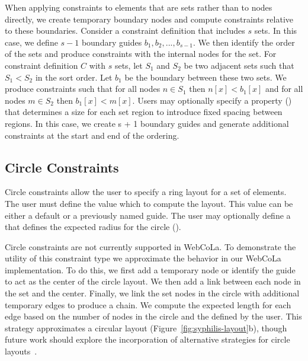 When applying constraints to elements that are sets rather than to nodes
directly, we create temporary boundary nodes and compute constraints relative to
these boundaries. Consider a constraint definition that includes $s$ sets. 
In this case, we define $s-1$ boundary guides $b_1, b_2, ..., b_{s-1}$. We then
identify the order of the sets and produce constraints with the internal
nodes for the set. For constraint definition $C$ with $s$ sets, let $S_1$ and
$S_2$ be two adjacent sets such that $S_1 < S_2$ in the sort order. Let $b_1$ be
the boundary between these two sets. We produce constraints such that for all
nodes $n \in S_1$ then $n[x] < b_1[x]$ and for all nodes $m \in S_2$ then $b_1[x] < m[x]$.
Users may optionally specify a  property ()
that determines a size for each set region to introduce fixed spacing between regions.
In this case, we create s + 1 boundary guides and generate additional 
constraints at the start and end of the ordering.

\subsection{Circle Constraints}
Circle constraints allow the user to specify a ring layout for a set of
elements. The user must define the value  which to compute 
the layout. This value can be either a default  or a previously 
named guide. The user may optionally define a  that 
defines the expected radius for the circle ().

Circle constraints are not currently supported in WebCoLa. To
demonstrate the utility of this constraint type we approximate the behavior
in our WebCoLa implementation. To do this, we first add a temporary node
or identify the guide to act as the center of the circle layout.  We
then add a link between each
node in the set and the center. Finally, we link the set nodes in the circle
with additional temporary edges to produce a chain. We compute the expected
length for each edge based on the number of nodes in the circle and the 
 defined by the user. This strategy approximates a circular
layout (Figure~\ref{fig:syphilis-layout}b), though future work should
explore the incorporation of alternative strategies for circle layouts~\cite{dwyer2009layout}.

